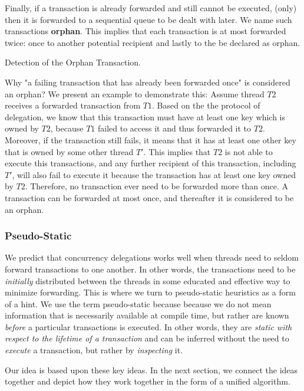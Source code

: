 Finally, if a transaction is already forwarded and still cannot be executed, (only) then it is
forwarded to a sequential queue to be dealt with later. We name such transactions \textbf{orphan}.
This implies that each transaction is at most forwarded twice: once to another potential recipient
and lastly to the be declared as orphan.

\begin{lemma}
	Detection of the Orphan Transaction.

	Why "a failing transaction that has already been forwarded once" is considered an orphan? We
	present an example to demonstrate this: Assume thread $T2$ receives a forwarded transaction from
	$T1$. Based on the the protocol of delegation, we know that this transaction must have at least
	one key which is owned by $T2$, because $T1$ failed to access it and thus forwarded it to $T2$.
	Moreover, if the transaction still fails, it means that it has at least one other key that is
	owned by some other thread $T'$. This implies that $T2$ is not able to execute this
	transactions, and any further recipient of this transaction, including $T'$, will also fail to
	execute it because the transaction has at least one key owned by $T2$. Therefore, no transaction
	ever need to be forwarded more than once. A transaction can be forwarded at most once, and
	thereafter it is considered to be an orphan.
\end{lemma}

\subsubsection{Pseudo-Static}

We predict that concurrency delegations works well when threads need to seldom forward transactions
to one another. In other words, the transactions need to be \textit{initially} distributed between
the threads in some educated and effective way to minimize forwarding. This is where we turn to
pseudo-static heuristics as a form of a hint. We use the term pseudo-static because because we do
not mean information that is necessarily available at compile time, but rather are known
\textit{before} a particular transactions is executed. In other words, they are \textit{static with
respect to the lifetime of a transaction} and can be inferred without the need to \textit{execute} a
transaction, but rather by \textit{inspecting} it.

Our idea is based upon these key ideas. In the next section, we connect the ideas together and
depict how they work together in the form of a unified algorithm.

